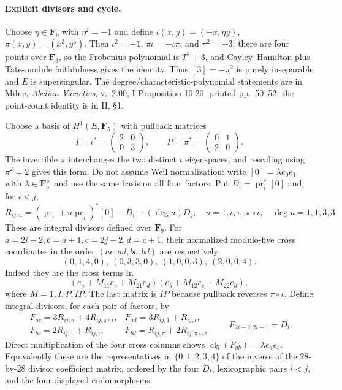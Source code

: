 \documentclass[11pt]{article}
\theoremstyle{remark}\newtheorem{remark}[theorem]{Remark}
\begin{document}
\paragraph{Explicit divisors and cycle.}
Choose $\eta\in\mathbf F_9$ with $\eta^2=-1$ and define
$\iota(x,y)=(-x,\eta y)$, $\pi(x,y)=(x^3,y^3)$.
Then $\iota^2=-1$, $\pi\iota=-\iota\pi$, and $\pi^2=-3$:
there are four points over $\mathbf F_3$, so the Frobenius
polynomial is $T^2+3$, and Cayley--Hamilton plus Tate-module
faithfulness gives the identity. Thus $[3]=-\pi^2$ is purely
inseparable and $E$ is supersingular.
The degree/characteristic-polynomial statements are in Milne,
\emph{Abelian Varieties}, v.~2.00, I Proposition 10.20,
printed pp.~50--52; the point-count identity is in II, \S1.

Choose a basis of $H^1(E,\mathbf F_5)$ with pullback matrices
\[
 I=\iota^*=\begin{pmatrix}2&0\\0&3\end{pmatrix},\qquad
 P=\pi^*=\begin{pmatrix}0&1\\2&0\end{pmatrix}.                 \tag{A10.2}
\]
The invertible $\pi$ interchanges the two distinct $\iota$
eigenspaces, and rescaling using $\pi^2=2$ gives this form.
Do not assume Weil normalization: write $[0]=\lambda e_0e_1$
with $\lambda\in\mathbf F_5^\times$ and use the same basis on all
four factors. Put $D_i=\operatorname{pr}_i^*[0]$ and, for $i<j$,
\[
 R_{ij,u}=(\operatorname{pr}_i+u\operatorname{pr}_j)^*[0]
                    -D_i-(\deg u)D_j,\quad
 u=1,\iota,\pi,\pi\circ\iota,\quad \deg u=1,1,3,3.            \tag{A10.3}
\]
These are integral divisors defined over $\mathbf F_9$.
For $a=2i-2,b=a+1,c=2j-2,d=c+1$, their normalized modulo-five
cross coordinates in the order $(ac,ad,bc,bd)$ are respectively
\[
 (0,1,4,0),\ (0,3,3,0),\ (1,0,0,3),\ (2,0,0,4).
\]
Indeed they are the cross terms in
\[
 (e_a+M_{11}e_c+M_{21}e_d)(e_b+M_{12}e_c+M_{22}e_d),
\]
where $M=1,I,P,IP$. The last matrix is $IP$ because pullback
reverses $\pi\circ\iota$.
Define integral divisors, for each pair of factors, by
\[
 \begin{array}{ll}
 F_{ac}=3R_{ij,\pi}+4R_{ij,\pi\circ\iota},&
 F_{ad}=3R_{ij,1}+R_{ij,\iota},\\
 F_{bc}=2R_{ij,1}+R_{ij,\iota},&
 F_{bd}=R_{ij,\pi}+2R_{ij,\pi\circ\iota},
 \end{array}
 \qquad F_{2i-2,2i-1}=D_i.                                  \tag{A10.4}
\]
Direct multiplication of the four cross columns shows
$\operatorname{cl}_5(F_{ab})=\lambda e_ae_b$.
Equivalently these are the representatives in $\{0,1,2,3,4\}$
of the inverse of the $28$-by-$28$ divisor coefficient matrix,
ordered by the four $D_i$, lexicographic pairs $i<j$, and the
four displayed endomorphisms.
\end{document}
